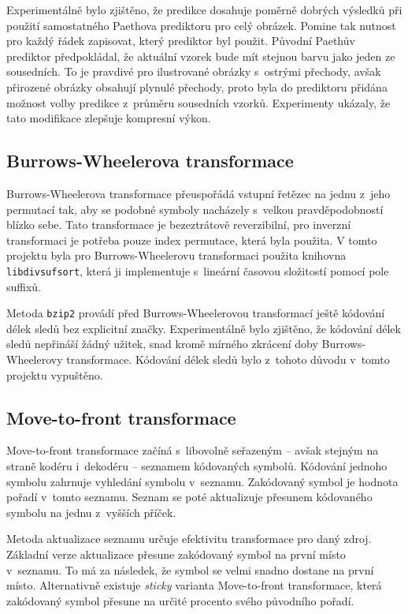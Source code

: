 \documentclass[a4paper, 11pt, titlepage]{article}
\begin{document}
	Experimentálně bylo zjištěno, že predikce dosahuje poměrně dobrých výsledků při použití samo\-stat\-né\-ho Paethova prediktoru pro celý obrázek.
	Pomine tak nutnost pro každý řádek zapisovat, který prediktor byl použit.
	Původní Paethův prediktor předpokládal, že aktuální vzorek bude mít stejnou barvu jako jeden ze sousedních.
	To je pravdivé pro ilustrované obrázky s~ostrými přechody, avšak přirozené obrázky obsahují plynulé přechody, proto byla do prediktoru přidána možnost volby predikce z~průměru sousedních vzorků.
	Experimenty ukázaly, že tato modifikace zlepšuje kompresní výkon.

	\subsection*{Burrows-Wheelerova transformace}
	Burrows-Wheelerova transformace přeuspořádá vstupní řetězec na jednu z~jeho permutací tak, aby se podobné symboly nacházely s~velkou prav\-dě\-po\-dob\-nos\-tí blízko sebe.
	Tato transformace je bezeztrátově reverzibilní, pro inverzní transformaci je potřeba pouze index permutace, která byla použita.
	V tomto projektu byla pro Burrows-Wheelerovu transformaci použita knihovna \texttt{libdivsufsort}, která ji implementuje s~lineární časovou složitostí pomocí pole suffixů.

	Metoda \texttt{bzip2} provádí před Burrows-Wheelerovou transformací ještě kódování délek sledů bez explicitní značky.
	Experimentálně bylo zjištěno, že kódování délek sledů nepřináší žádný užitek, snad kromě mírného zkrácení doby Burrows-Wheelerovy transformace.
	Kódování délek sledů bylo z~tohoto důvodu v~tomto projektu vypuštěno.

	\subsection*{Move-to-front transformace}
	Move-to-front transformace začíná s~libovolně seřazeným -- avšak stejným na straně kodéru i~dekodéru -- seznamem kódovaných symbolů.
	Kódování jednoho symbolu zahrnuje vyhledání symbolu v~seznamu.
	Zakódovaný symbol je hodnota pořadí v~tomto seznamu.
	Seznam se poté aktualizuje přesunem kódovaného symbolu na jednu z~vyšších příček.

	Metoda aktualizace seznamu určuje efektivitu transformace pro daný zdroj.
	Základní verze aktualizace přesune zakódovaný symbol na první místo v~seznamu.
	To má za následek, že symbol se velmi snadno dostane na první místo.
	Alternativně existuje \textit{sticky} varianta Move-to-front transformace, která zakódovaný symbol přesune na určité procento svého původního pořadí.
\end{document}
